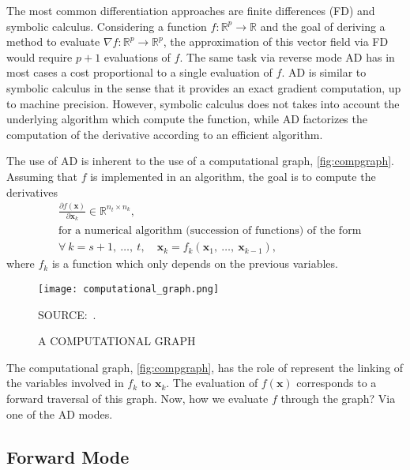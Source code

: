 The most common differentiation approaches are finite differences (FD)
and symbolic calculus. Considering a function \(f: \mathbb{R}^{p}
\rightarrow \mathbb{R}\) and the goal of deriving a method to evaluate
\(\nabla f: \mathbb{R}^{p} \rightarrow \mathbb{R}^{p}\), the
approximation of this vector field via FD would require \(p + 1\)
evaluations of \(f\). The same task via reverse mode AD has in most
cases a cost proportional to a single evaluation of \(f\). AD is similar
to symbolic calculus in the sense that it provides an exact gradient
computation, up to machine precision. However, symbolic calculus does
not takes into account the underlying algorithm which compute the
function, while AD factorizes the computation of the derivative
according to an efficient algorithm.

The use of AD is inherent to the use of a computational graph,
\autoref{fig:compgraph}. Assuming that \(f\) is implemented in an
algorithm, the goal is to compute the derivatives
\begin{align*}
  &\frac{\partial f(\mathbf{x})}{\partial\mathbf{x}_{k}}\in
  \mathbb{R}^{n_{t} \times n_{k}},\\
  &\text{for a numerical algorithm
         (succession of functions) of the form}\\
  &\forall~k = s + 1,~\dots,~t,\quad
    \mathbf{x}_{k} = f_{k}(\mathbf{x}_{1},~\dots,~\mathbf{x}_{k-1}),
\end{align*}
where \(f_{k}\) is a function which only depends on the previous
variables.

\begin{figure}[H]
  \setlength{\abovecaptionskip}{.0001pt}
  \caption{A COMPUTATIONAL GRAPH}
  \vspace{0.3cm} \centering
  \texttt{[image: computational\_graph.png]}
  \\
  \vspace{0.3cm}
  \begin{footnotesize}
    SOURCE:~.
  \end{footnotesize}
  \label{fig:compgraph}
\end{figure}

The computational graph, \autoref{fig:compgraph}, has the role of
represent the linking of the variables involved in \(f_{k}\) to
\(\mathbf{x}_{k}\). The evaluation of \(f(\mathbf{x})\) corresponds to a
forward traversal of this graph. Now, how we evaluate \(f\) through the
graph? Via one of the AD modes.

\subsection{Forward Mode}

